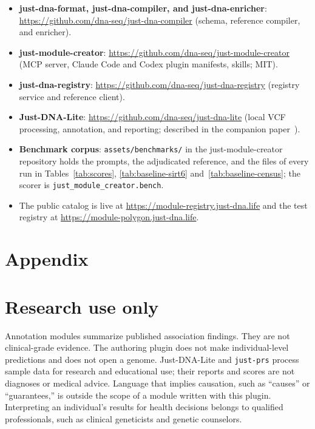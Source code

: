 \documentclass[11pt,a4paper]{article}
\begin{document}
\begin{itemize}
    \item \textbf{just-dna-format, just-dna-compiler, and just-dna-enricher}:
    \url{https://github.com/dna-seq/just-dna-compiler}
    (schema, reference compiler, and enricher).
    \item \textbf{just-module-creator}:
    \url{https://github.com/dna-seq/just-module-creator}
    (MCP server, Claude Code and Codex plugin manifests, skills; MIT).
    \item \textbf{just-dna-registry}:
    \url{https://github.com/dna-seq/just-dna-registry}
    (registry service and reference client).
    \item \textbf{Just-DNA-Lite}:
    \url{https://github.com/dna-seq/just-dna-lite}
    (local VCF processing, annotation, and reporting; described in the
    companion paper~\citep{companion2026justdnalite}).
    \item \textbf{Benchmark corpus}: \texttt{assets/benchmarks/} in the
    just-module-creator repository holds the prompts, the adjudicated reference,
    and the files of every run in Tables~\ref{tab:scores},
    \ref{tab:baseline-sirt6} and~\ref{tab:baseline-census}; the scorer is
    \texttt{just\_module\_creator.bench}.
    \item The public catalog is live at \url{https://module-registry.just-dna.life}
    and the test registry at \url{https://module-polygon.just-dna.life}.
\end{itemize}




\appendix
\section*{Appendix}

\section{Research use only}
\label{app:ruo}

Annotation modules summarize published association findings. They are not
clinical-grade evidence. The authoring plugin does not make individual-level
predictions and does not open a genome. Just-DNA-Lite and \texttt{just-prs}
process sample data for research and educational use; their reports and scores
are not diagnoses or medical advice. Language that implies causation, such as
``causes'' or ``guarantees,'' is outside the scope of a module written with this
plugin. Interpreting an individual's results for health decisions belongs to
qualified professionals, such as clinical geneticists and genetic counselors.
\end{document}
